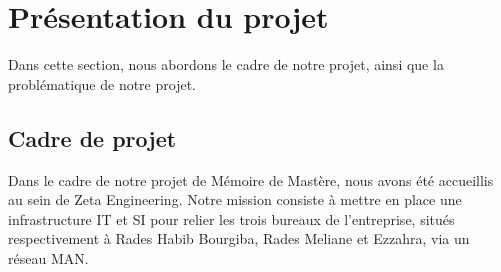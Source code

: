 \section{Présentation du projet}

Dans cette section, nous abordons le cadre de notre projet, ainsi que la problématique de notre projet.


\subsection{Cadre de projet}
Dans le cadre de notre projet de Mémoire de Mastère, nous avons été accueillis au sein de Zeta Engineering. Notre mission consiste à mettre en place une infrastructure IT et SI pour relier les trois bureaux de l'entreprise, situés respectivement à Rades Habib Bourgiba, Rades Meliane et Ezzahra, via un réseau MAN.\\


